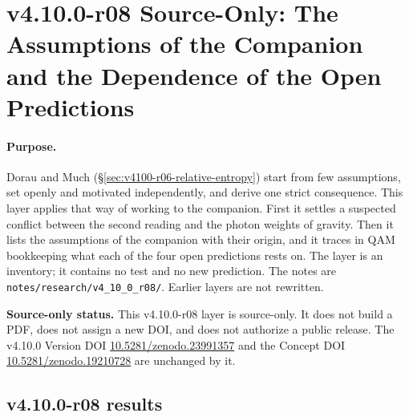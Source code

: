 \clearpage
\section*{v4.10.0-r08 Source-Only: The Assumptions of the Companion and the Dependence of the Open Predictions}
\label{sec:v4100-r08-assumptions}

\paragraph{Purpose.}
Dorau and Much (\S\ref{sec:v4100-r06-relative-entropy}) start from few assumptions, set openly and motivated independently, and derive one
strict consequence.  This layer applies that way of working to the companion.  First it settles a suspected conflict between the second reading
and the photon weights of gravity.  Then it lists the assumptions of the companion with their origin, and it traces in QAM bookkeeping what each of
the four open predictions rests on.  The layer is an inventory; it contains no test and no new prediction.  The notes are
\texttt{notes/\allowbreak research/\allowbreak v4\_10\_0\_r08/}.  Earlier layers are not rewritten.

\noindent\textbf{Source-only status.}
This v4.10.0-r08 layer is source-only.  It does not build a PDF, does not assign a new DOI,
and does not authorize a public release.  The v4.10.0 Version DOI
\href{https://doi.org/10.5281/zenodo.23991357}{10.5281/zenodo.23991357} and the Concept DOI
\href{https://doi.org/10.5281/zenodo.19210728}{10.5281/zenodo.19210728} are unchanged by it.

\subsection*{v4.10.0-r08 results}
\label{subsec:v4100-r08-results}


